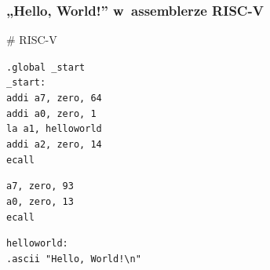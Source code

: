 \documentclass[10pt,t]{beamer}
\begin{document}
\begin{frame}
  \frametitle{„Hello, World!” w~assemblerze RISC-V
    \parencite{Anonymous-Hello-World-in-x86-Assembly-Language}}


  \# RISC-V

  \texttt{.global \_start} \\
  \texttt{\_start:} \\
  \hphantom{aaaa} \texttt{addi a7, zero, 64} \\
  \hphantom{aaaa} \texttt{addi a0, zero, 1} \\
  \hphantom{aaaa} \texttt{la a1, helloworld} \\
  \hphantom{aaaa} \texttt{addi a2, zero, 14} \\
  \hphantom{aaaa} \texttt{ecall}
  \vspace{0.8em}

  \hphantom{aaaa} \texttt{a7, zero, 93} \\
  \hphantom{aaaa} \texttt{a0, zero, 13} \\
  \hphantom{aaaa} \texttt{ecall}
  \vspace{0.8em}

  \texttt{helloworld:} \\
  \hphantom{aaaa} \texttt{.ascii "Hello, World!\textbackslash n"}

\end{frame}
\end{document}

